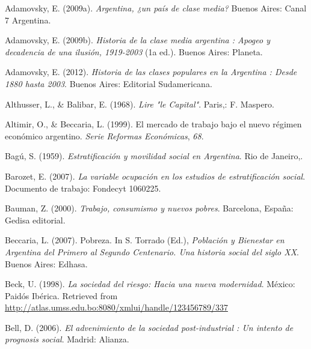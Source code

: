 \documentclass[
]{article}
\newlength{\cslhangindent}
\newlength{\cslentryspacingunit} %
\newenvironment{CSLReferences}[2] %
 {%
  \setlength{\parindent}{0pt}
  \ifodd #1
  \let\oldpar\par
  \def\par{\hangindent=\cslhangindent\oldpar}
  \fi
  \setlength{\parskip}{#2\cslentryspacingunit}
 }%
 {}
\begin{document}
\hypertarget{refs}{}
\begin{CSLReferences}{1}{0}
\leavevmode{}%
Adamovsky, E. (2009a). \emph{Argentina, ¿un país de clase media?} Buenos Aires: Canal 7 Argentina.

\leavevmode{}%
Adamovsky, E. (2009b). \emph{Historia de la clase media argentina : Apogeo y decadencia de una ilusión, 1919-2003} (1a ed.). Buenos Aires: Planeta.

\leavevmode{}%
Adamovsky, E. (2012). \emph{Historia de las clases populares en la {Argentina} : Desde 1880 hasta 2003}. Buenos Aires: Editorial Sudamericana.

\leavevmode{}%
Althusser, L., \& Balibar, E. (1968). \emph{Lire "le {Capital}"}. Paris,: F. Maspero.

\leavevmode{}%
Altimir, O., \& Beccaria, L. (1999). El mercado de trabajo bajo el nuevo régimen económico argentino. \emph{Serie Reformas Económicas}, \emph{68}.

\leavevmode{}%
Bagú, S. (1959). \emph{Estratificación y movilidad social en {Argentina}}. Rio de Janeiro,.

\leavevmode{}%
Barozet, E. (2007). \emph{La variable ocupación en los estudios de estratificación social}. Documento de trabajo: Fondecyt 1060225.

\leavevmode{}%
Bauman, Z. (2000). \emph{Trabajo, consumismo y nuevos pobres}. Barcelona, España: Gedisa editorial.

\leavevmode{}%
Beccaria, L. (2007). Pobreza. In S. Torrado (Ed.), \emph{Población y {Bienestar} en {Argentina} del {Primero} al {Segundo} {Centenario}. {Una} historia social del siglo {XX}}. Buenos Aires: Edhasa.

\leavevmode{}%
Beck, U. (1998). \emph{La sociedad del riesgo: Hacia una nueva modernidad}. México: Paidós Ibérica. Retrieved from \url{http://atlas.umss.edu.bo:8080/xmlui/handle/123456789/337}

\leavevmode{}%
Bell, D. (2006). \emph{El advenimiento de la sociedad post-industrial : Un intento de prognosis social}. Madrid: Alianza.


\end{CSLReferences}
\end{document}
